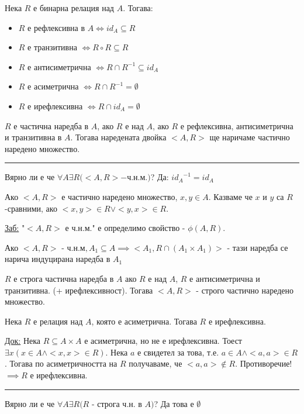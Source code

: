 \documentclass[fleqn, titlepage, 12pt]{report}
\begin{document}
 Нека $R$ е бинарна релация над $A$. Тогава:
\begin{itemize}
  \item $R$ е рефлексивна в $A \Longleftrightarrow id_A \subseteq R$ 
  \item $R$ е транзитивна $\Longleftrightarrow R \circ R \subseteq R$
  \item $R$ е антисиметрична $\Longleftrightarrow R \cap R^{-1} \subseteq id_A$
  \item $R$ е асиметрична $\Longleftrightarrow R \cap R^{-1} = \emptyset$
  \item $R$ е ирефлексивна $\Longleftrightarrow R \cap id_A = \emptyset$
\end{itemize}

 $R$ е частична наредба в $A$, ако $R$ е над $A$, ако $R$ е рефлексивна, антисиметрична и транзитивна в $A$.
Тогава наредената двойка $<A,R>$ ще наричаме частично наредено множество.

\bigbreak
\hrule
\bigbreak

Вярно ли е че $\forall{A}\exists{R}(<A,R> - $ч.н.м.$)$? Да: ${id_A}^{-1} = id_A$
\bigbreak

 Ако $<A,R>$ е частично наредено множество, $x,y \in A$. Казваме че $x$ и $y$ са $R$-сравними, ако
$<x,y> \in R \lor <y,x> \in R$.
\bigbreak

\underline{Заб:} "$<A,R>$ е ч.н.м." е определимо свойство - $\phi(A,R)$.

Ако $<A,R>$ - ч.н.м$, A_1 \subseteq A \implies <A_1, R \cap (A_1 \times A_1)>$ - тази наредба се нарича индуцирана наредба в $A_1$
\bigbreak

 $R$ е строга частична наредба в $A$ ако $R$ е над $A$, $R$ е антисиметрична и транзитивна. (+ ирефлексивност).
Тогава $<A,R>$ - строго частично наредено множество.
\bigbreak

 Нека $R$ е релация над $A$, която е асиметрична. Тогава $R$ е ирефлексивна.
\bigbreak

\underline{Док:} Нека $R \subseteq A \times A$ е асиметрична, но не е ирефлексивна.
Тоест $\exists{x}(x \in A \land <x,x> \in R)$. Нека $a$ е свидетел за това, т.е. $a \in A \land <a,a> \in R$.
Тогава по асиметричността на $R$ получаваме, че $<a,a> \notin R$. Противоречие! $\implies R$ е ирефлексивна.

\bigbreak
\hrule
\bigbreak

Вярно ли е че $\forall{A}\exists{R}(R $ - строга ч.н. в $A)$? Да това е $\emptyset$
\bigbreak
\end{document}
